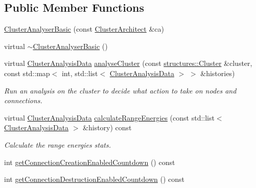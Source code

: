 \subsection*{\-Public \-Member \-Functions}
\begin{DoxyCompactItemize}
\item 
\hyperlink{classcryomesh_1_1manipulators_1_1ClusterAnalyserBasic_a66208b2a0fb140dd61b32f2ed0c7769a}{\-Cluster\-Analyser\-Basic} (const \hyperlink{classcryomesh_1_1manipulators_1_1ClusterArchitect}{\-Cluster\-Architect} \&ca)
\item 
virtual \hyperlink{classcryomesh_1_1manipulators_1_1ClusterAnalyserBasic_a6b580c3b0b28b0d9b56132aebe5c72ae}{$\sim$\-Cluster\-Analyser\-Basic} ()
\item 
virtual \hyperlink{classcryomesh_1_1manipulators_1_1ClusterAnalysisData}{\-Cluster\-Analysis\-Data} \hyperlink{classcryomesh_1_1manipulators_1_1ClusterAnalyserBasic_ad98be2e316548236479ce5da459d530b}{analyse\-Cluster} (const \hyperlink{classcryomesh_1_1structures_1_1Cluster}{structures\-::\-Cluster} \&cluster, const std\-::map$<$ int, std\-::list$<$ \hyperlink{classcryomesh_1_1manipulators_1_1ClusterAnalysisData}{\-Cluster\-Analysis\-Data} $>$ $>$ \&histories)
\begin{DoxyCompactList}\small\item\em \-Run an analysis on the cluster to decide what action to take on nodes and connections. \end{DoxyCompactList}\item 
virtual \hyperlink{classcryomesh_1_1manipulators_1_1ClusterAnalysisData}{\-Cluster\-Analysis\-Data} \hyperlink{classcryomesh_1_1manipulators_1_1ClusterAnalyserBasic_ab4e344d193d764d0e60aaed87c9770b3}{calculate\-Range\-Energies} (const std\-::list$<$ \hyperlink{classcryomesh_1_1manipulators_1_1ClusterAnalysisData}{\-Cluster\-Analysis\-Data} $>$ \&history) const 
\begin{DoxyCompactList}\small\item\em \-Calculate the range energies stats. \end{DoxyCompactList}\item 
int \hyperlink{classcryomesh_1_1manipulators_1_1ClusterAnalyserBasic_acfcf0391f2856585d76e72abb3cb729a}{get\-Connection\-Creation\-Enabled\-Countdown} () const 
\item 
int \hyperlink{classcryomesh_1_1manipulators_1_1ClusterAnalyserBasic_a6662b6935836b9a01c62834f09cad3b0}{get\-Connection\-Destruction\-Enabled\-Countdown} () const 
\item 

\end{DoxyCompactItemize}
